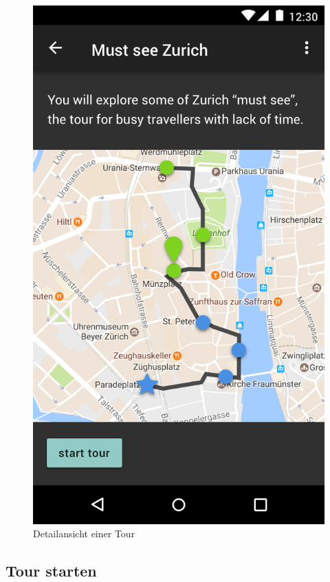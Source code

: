 \documentclass[a4paper,10pt,xetex]{article}
\begin{document}
\begin{figure}
\begin{minipage}[b]{0.48\textwidth}
    \includegraphics[width=\textwidth]{DetailActivity}
    \caption{Detailansicht einer Tour}
  \end{minipage}
\end{figure}


\subsection{Tour starten}
\end{document}
